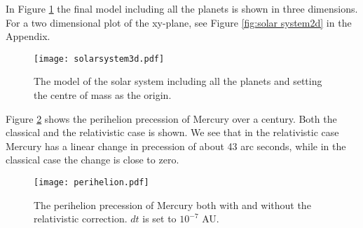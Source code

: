 In Figure \ref{fig:solar system} the final model including all the planets is shown in three dimensions. For a two dimensional plot of the xy-plane, see Figure \ref{fig:solar system2d} in the Appendix.
\begin{figure}[htbp]
	\centering
	\texttt{[image: solarsystem3d.pdf]}
	\caption{The model of the solar system including all the planets and setting the centre of mass as the origin.}
	\label{fig:solar system}
\end{figure}

Figure \ref{fig:perihelion} shows the perihelion precession of Mercury over a century. Both the classical and the relativistic case is shown. We see that in the relativistic case Mercury has a linear change in precession of about 43 arc seconds, while in the classical case the change is close to zero.
\begin{figure}[htbp]
	\centering
	\texttt{[image: perihelion.pdf]}
	\caption{The perihelion precession of Mercury both with and without the relativistic correction. $dt$ is set to $10^{-7}$ AU.}
	\label{fig:perihelion}
\end{figure}
